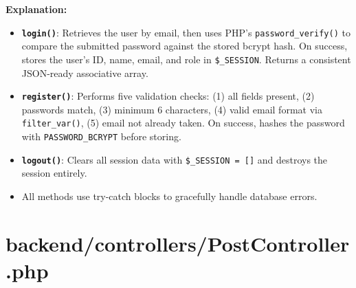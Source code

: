 \documentclass[12pt,a4paper]{report}
\begin{document}
\textbf{Explanation:}
\begin{itemize}
    \item \textbf{\texttt{login()}}: Retrieves the user by email, then uses PHP's \texttt{password\_verify()} to compare the submitted password against the stored bcrypt hash. On success, stores the user's ID, name, email, and role in \texttt{\$\_SESSION}. Returns a consistent JSON-ready associative array.
    \item \textbf{\texttt{register()}}: Performs five validation checks: (1) all fields present, (2) passwords match, (3) minimum 6 characters, (4) valid email format via \texttt{filter\_var()}, (5) email not already taken. On success, hashes the password with \texttt{PASSWORD\_BCRYPT} before storing.
    \item \textbf{\texttt{logout()}}: Clears all session data with \texttt{\$\_SESSION = []} and destroys the session entirely.
    \item All methods use try-catch blocks to gracefully handle database errors.
\end{itemize}

\section{backend/controllers/PostController.php}
\end{document}
